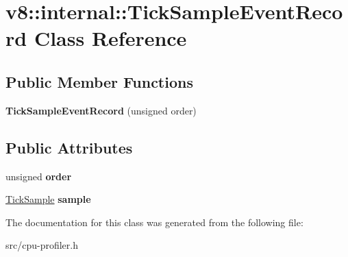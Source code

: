 \hypertarget{classv8_1_1internal_1_1_tick_sample_event_record}{}\section{v8\+:\+:internal\+:\+:Tick\+Sample\+Event\+Record Class Reference}
\label{classv8_1_1internal_1_1_tick_sample_event_record}
\subsection*{Public Member Functions}
\begin{DoxyCompactItemize}
\item 
\hypertarget{classv8_1_1internal_1_1_tick_sample_event_record_aded34e816837806ba11c170fa55bb5fe}{}{\bfseries Tick\+Sample\+Event\+Record} (unsigned order)\label{classv8_1_1internal_1_1_tick_sample_event_record_aded34e816837806ba11c170fa55bb5fe}

\end{DoxyCompactItemize}
\subsection*{Public Attributes}
\begin{DoxyCompactItemize}
\item 
\hypertarget{classv8_1_1internal_1_1_tick_sample_event_record_a136c35b8cd9e65607f18a8a269180058}{}unsigned {\bfseries order}\label{classv8_1_1internal_1_1_tick_sample_event_record_a136c35b8cd9e65607f18a8a269180058}

\item 
\hypertarget{classv8_1_1internal_1_1_tick_sample_event_record_a69f640310e3dcca5a503a0a5b71f1d27}{}\hyperlink{structv8_1_1internal_1_1_tick_sample}{Tick\+Sample} {\bfseries sample}\label{classv8_1_1internal_1_1_tick_sample_event_record_a69f640310e3dcca5a503a0a5b71f1d27}

\end{DoxyCompactItemize}


The documentation for this class was generated from the following file\+:\begin{DoxyCompactItemize}
\item 
src/cpu-\/profiler.\+h\end{DoxyCompactItemize}
